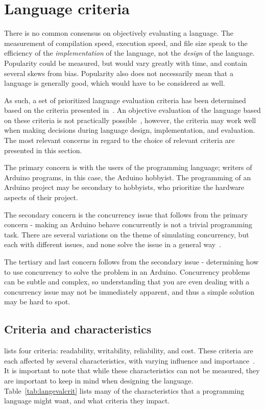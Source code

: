 \section{Language criteria}\label{sec:languageeval}
There is no common consensus on objectively evaluating a language. The measurement of compilation speed, execution speed, and file size speak to the efficiency of the \textit{implementation} of the language, not the \textit{design} of the language. Popularity could be measured, but would vary greatly with time, and contain several skews from bias. Popularity also does not necessarily mean that a language is generally good, which would have to be considered as well.

As such, a set of prioritized language evaluation criteria has been determined based on the criteria presented in~\cite{Sebesta2016}. An objective evaluation of the language based on these criteria is not practically possible~\cite{Sebesta2016}, however, the criteria may work well when making decisions during language design, implementation, and evaluation. The most relevant concerns in regard to the choice of relevant criteria are presented in this section.

The primary concern is with the users of the programming language; writers of Arduino programs, in this case, the Arduino hobbyist. The programming of an Arduino project may be secondary to hobbyists, who prioritize the hardware aspects of their project.

The secondary concern is the concurrency issue that follows from the primary concern - making an Arduino behave concurrently is not a trivial programming task. There are several variations on the theme of simulating concurrency, but each with different issues, and none solve the issue in a general way~\cite{Restucia2022}.

The tertiary and last concern follows from the secondary issue - determining how to use concurrency to solve the problem in an Arduino. Concurrency problems can be subtle and complex, so understanding that you are even dealing with a concurrency issue may not be immediately apparent, and thus a simple solution may be hard to spot.

\subsection{Criteria and characteristics}\label{subsec:priorityofcriteria}
 lists four criteria: readability, writability, reliability, and cost. These criteria are each affected by several characteristics, with varying influence and importance~\cite{Sebesta2016}. It is important to note that while these characteristics can not be measured, they are important to keep in mind when designing the language. Table~\ref{tab:langevalcrit} lists many of the characteristics that a programming language might want, and what criteria they impact.


